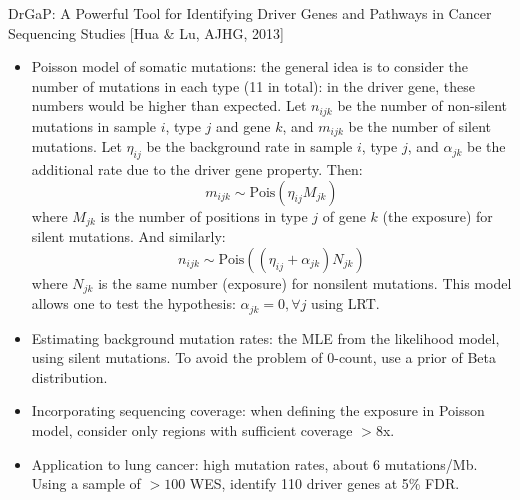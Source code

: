 \documentclass{report}
\begin{document}
DrGaP: A Powerful Tool for Identifying Driver Genes and Pathways in Cancer Sequencing Studies [Hua \& Lu, AJHG, 2013]
\begin{itemize}
	\item Poisson model of somatic mutations: the general idea is to consider the number of mutations in each type (11 in total): in the driver gene, these numbers would be higher than expected. Let $n_{ijk}$ be the number of non-silent mutations in sample $i$, type $j$ and gene $k$, and $m_{ijk}$ be the number of silent mutations. Let $\eta_{ij}$ be the background rate in sample $i$, type $j$, and $\alpha_{jk}$ be the additional rate due to the driver gene property. Then: 
	\begin{equation}
	m_{ijk} \sim \text{Pois}(\eta_{ij} M_{jk})
	\end{equation}
	where $M_{jk}$ is the number of positions in type $j$ of gene $k$ (the exposure) for silent mutations. And similarly: 
	\begin{equation}
	n_{ijk} \sim \text{Pois}((\eta_{ij} + \alpha_{jk}) N_{jk})
	\end{equation}
	where $N_{jk}$ is the same number (exposure) for nonsilent mutations. This model allows one to test the hypothesis: $\alpha_{jk} = 0, \forall j$ using LRT. 
	
	\item Estimating background mutation rates: the MLE from the likelihood model, using silent mutations. To avoid the problem of 0-count, use a prior of Beta distribution. 
	
	\item Incorporating sequencing coverage: when defining the exposure in Poisson model, consider only regions with sufficient coverage $>8$x.  
	
	\item Application to lung cancer: high mutation rates, about 6 mutations/Mb. Using a sample of $>100$ WES, identify 110 driver genes at 5\% FDR. 
\end{itemize}
\end{document}
